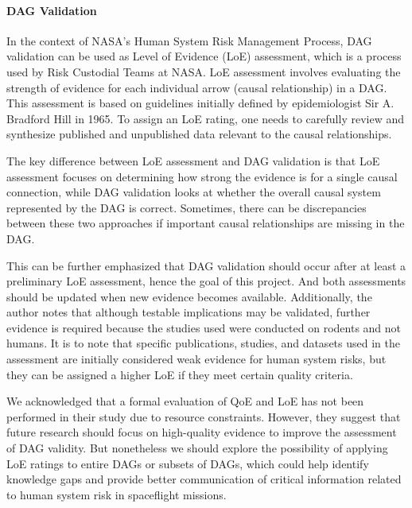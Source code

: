 \documentclass{article}
\begin{document}
\paragraph{DAG Validation}
In the context of NASA's Human System Risk Management Process, DAG validation can be used as Level of Evidence (LoE) assessment, which is a process used by Risk Custodial Teams at NASA.
LoE assessment involves evaluating the strength of evidence for each individual arrow (causal relationship) in a DAG. This assessment is based on guidelines initially defined by epidemiologist Sir A. Bradford Hill in 1965. To assign an LoE rating, one needs to carefully review and synthesize published and unpublished data relevant to the causal relationships.

The key difference between LoE assessment and DAG validation is that LoE assessment focuses on determining how strong the evidence is for a single causal connection, while DAG validation looks at whether the overall causal system represented by the DAG is correct. Sometimes, there can be discrepancies between these two approaches if important causal relationships are missing in the DAG.

This can be further emphasized that DAG validation should occur after at least a preliminary LoE assessment, hence the goal of this project. And both assessments should be updated when new evidence becomes available. Additionally, the author notes that although testable implications may be validated, further evidence is required because the studies used were conducted on rodents and not humans.
It is to note that specific publications, studies, and datasets used in the assessment are initially considered weak evidence for human system risks, but they can be assigned a higher LoE if they meet certain quality criteria.

We acknowledged that a formal evaluation of QoE and LoE has not been performed in their study due to resource constraints. However, they suggest that future research should focus on high-quality evidence to improve the assessment of DAG validity.
But nonetheless we should explore the possibility of applying LoE ratings to entire DAGs or subsets of DAGs, which could help identify knowledge gaps and provide better communication of critical information related to human system risk in spaceflight missions.
\end{document}
